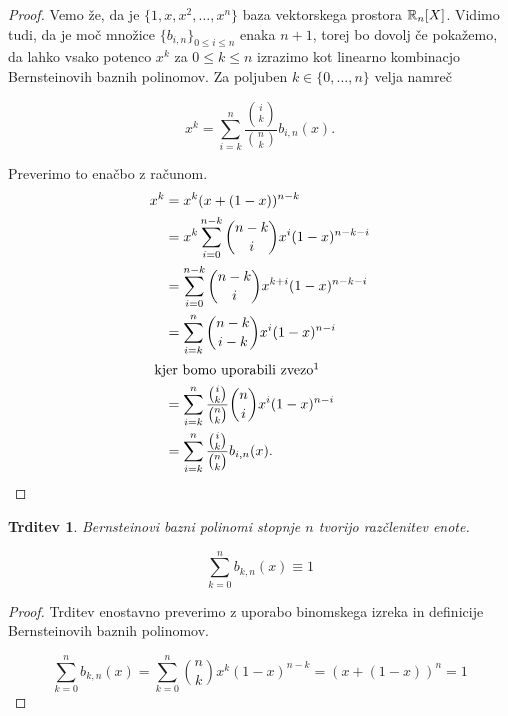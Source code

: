 \documentclass[a4paper]{amsart}
\theoremstyle{theorem}
\newtheorem{trditev}[izrek]{Trditev}
\theoremstyle{definition}
\begin{document}
\begin{proof}
	Vemo že, da je $\{1, x, x^2, \dots, x^n\}$ baza vektorskega prostora $\mathbb{R}_n[X]$.
	Vidimo tudi, da je moč množice $\{b_{i,n}\}_{0 \leq i \leq n}$ enaka $n + 1$,
	torej bo dovolj če pokažemo, da lahko vsako potenco $x^k$ za $0 \leq k \leq n$
	izrazimo kot linearno kombinacjo Bernsteinovih baznih polinomov. Za poljuben 
	$k \in \{0, \dots, n\}$ velja namreč

	$$ x^k = \sum_{i = k}^{n} \frac{\binom ik}{\binom nk} b_{i, n}(x)\text{.}$$

	Preverimo to enačbo z računom.
	\begin{align*}
	x^k &= x^k(x + (1 - x))^{n - k} \\
	&= x^k \sum_{i = 0}^{n - k} \binom{n - k}{i} x^i(1 - x)^{n - k - i} \\
	&= \sum_{i = 0}^{n - k} \binom{n - k}{i} x^{k + i}(1 - x)^{n - k - i} \\
	&= \sum_{i = k}^{n} \binom{n - k}{i - k} x^i(1 - x)^{n - i} \\
\intertext{
	kjer bomo uporabili zvezo\footnotemark
}
	&= \sum_{i = k}^{n} \frac{\binom ik}{\binom nk} \binom ni x^i(1 - x)^{n - i} \\
	&= \sum_{i = k}^{n} \frac{\binom ik}{\binom nk} b_{i, n}(x)\text{.}
	\end{align*}

\end{proof}

\begin{trditev}
	\label{razclenitev enote}
	Bernsteinovi bazni polinomi stopnje $n$ tvorijo razčlenitev enote.

	$$ \sum_{k=0}^{n}b_{k, n}(x) \equiv 1$$

\end{trditev}

\begin{proof}
	Trditev enostavno preverimo z uporabo binomskega izreka in definicije 
	Bernsteinovih baznih polinomov.

	$$ \sum_{k=0}^{n}b_{k, n}(x) = 
	\sum_{k=0}^{n} \binom nk x^k(1 - x)^{n - k} = 
	(x + (1 - x))^n = 
	1$$

\end{proof}

\end{document}
